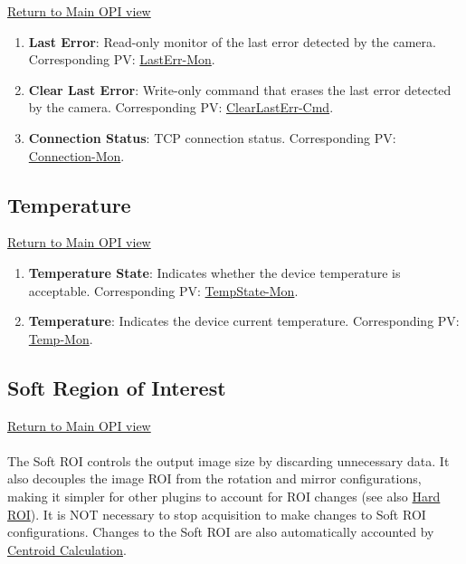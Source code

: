 \documentclass[openany]{article}
\begin{document}
        \hyperref[fig:opi-main]{Return to Main OPI view}

        \begin{enumerate}
            \item \textbf{Last Error}: Read-only monitor of the last error detected
                        by the camera. Corresponding PV: 
                        \hyperlink{pv:last-err}{LastErr-Mon}.
            \item \textbf{Clear Last Error}: Write-only command that erases the last
                        error detected by the camera. Corresponding PV: 
                        \hyperlink{pv:clear-last-err}{ClearLastErr-Cmd}.
            \item \textbf{Connection Status}: TCP connection status. Corresponding 
                        PV: \hyperlink{pv:connection}{Connection-Mon}.
        \end{enumerate}

    \subsection{Temperature}\label{sec:temp}

        \hyperref[fig:opi-main]{Return to Main OPI view}

        \begin{enumerate}
            \item \textbf{Temperature State}: Indicates whether the device temperature is acceptable. Corresponding PV: \hyperlink{pv:temp-state}{TempState-Mon}.
            \item \textbf{Temperature}: Indicates the device current temperature. Corresponding PV: \hyperlink{pv:temp}{Temp-Mon}.
        \end{enumerate}

    \subsection{Soft Region of Interest}\label{sec:soft-roi}

        \hyperref[fig:opi-main]{Return to Main OPI view}

        \paragraph{} The Soft ROI controls the output image size by discarding unnecessary data. It also decouples the image ROI from the rotation and mirror configurations, making it simpler for other plugins to account for ROI changes (see also \hyperref[sec:hard-roi]{Hard ROI}). It is NOT necessary to stop acquisition to make changes to Soft ROI configurations. Changes to the Soft ROI are also automatically accounted by \hyperref[sec:centroid-calc]{Centroid Calculation}.
\end{document}

